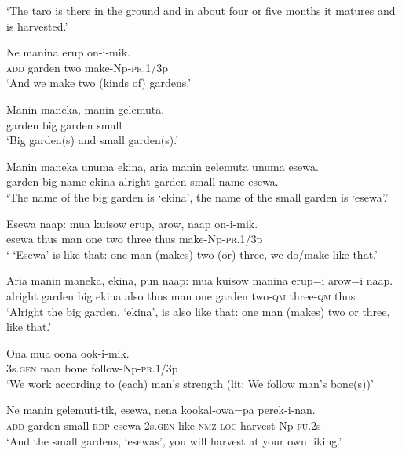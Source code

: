 \glt ‘The taro is there in the ground and in about four or five months it matures and is harvested.’ \\
\z


\ea
\gll  Ne  manina  erup  on-i-mik. \\
\textsc{add}  garden  two  make-Np-\textsc{pr}.1/3p \\
\glt ‘And we make two (kinds of) gardens.’ \\
\z


\ea
\gll  Manin  maneka,  manin  gelemuta. \\
garden  big  garden  small \\
\glt ‘Big garden(s) and small garden(s).’ \\
\z


\ea
\gll  Manin  maneka  unuma  ekina,  aria  manin  gelemuta  unuma  esewa. \\
garden  big  name  ekina  alright  garden  small  name  esewa. \\
\glt ‘The name of the big garden is ‘ekina’, the name of the small garden is ‘esewa’.’ \\
\z


\ea
\gll  Esewa  naap:  mua  kuisow  erup,  arow,  naap  on-i-mik. \\
esewa  thus  man  one  two  three  thus  make-Np-\textsc{pr}.1/3p \\
\glt ‘ ‘Esewa’ is like that: one man (makes) two (or) three, we do/make like that.’ \\
\z


\ea
\gll  Aria  manin  maneka,  ekina,  pun  naap:  mua  kuisow  manina  erup=i arow=i  naap. \\
alright  garden  big  ekina  also  thus  man  one  garden  two-\textsc{qm}           three-\textsc{qm}  thus \\


\glt ‘Alright the big garden, ‘ekina’, is also like that: one man (makes) two or three, like that.’ \\
\z


\ea
\gll  Ona  mua  oona  ook-i-mik. \\
3s.\textsc{gen}  man  bone  follow-Np-\textsc{pr}.1/3p \\
\glt ‘We work according to (each) man’s strength (lit: We follow man’s bone(s))’ \\
\z


\ea
\gll  Ne  manin  gelemuti-tik,  esewa,  nena  kookal-owa=pa  perek-i-nan. \\
\textsc{add}  garden  small-\textsc{rdp}  esewa  2s.\textsc{gen}  like-\textsc{nmz}-\textsc{loc}  harvest-Np-\textsc{fu}.2s \\
\glt ‘And the small gardens, ‘esewas’, you will harvest at your own liking.’ \\
\z


